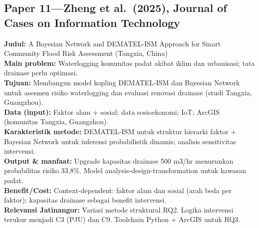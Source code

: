 \documentclass[a4paper,11pt]{article}
\begin{document}
\subsection*{Paper 11---Zheng et al.\ (2025), Journal of Cases on Information Technology}
\textbf{Judul:} A Bayesian Network and DEMATEL-ISM Approach for Smart Community Flood Risk Assessment (Tangxia, China)\\
\textbf{Main problem:} Waterlogging komunitas padat akibat iklim dan urbanisasi; tata drainase perlu optimasi.\\
\textbf{Tujuan:} Membangun model kopling DEMATEL-ISM dan Bayesian Network untuk asesmen risiko waterlogging dan evaluasi renovasi drainase (studi Tangxia, Guangzhou).\\
\textbf{Data (input):} Faktor alam + sosial; data sosioekonomi; IoT; ArcGIS (komunitas Tangxia, Guangzhou).\\
\textbf{Karakteristik metode:} DEMATEL-ISM untuk struktur hierarki faktor + Bayesian Network untuk inferensi probabilistik dinamis; analisis sensitivitas intervensi.\\
\textbf{Output \& manfaat:} Upgrade kapasitas drainase 500 m3/hr menurunkan probabilitas risiko 33,8\%. Model analysis-design-transformation untuk kawasan padat.\\
\textbf{Benefit/Cost:} Context-dependent: faktor alam dan sosial (arah beda per faktor); kapasitas drainase sebagai benefit intervensi.\\
\textbf{Relevansi Jatinangor:} Variasi metode struktural RQ2. Logika intervensi terukur menjadi C3 (PJU) dan C9. Toolchain Python + ArcGIS untuk RQ3.
\end{document}
